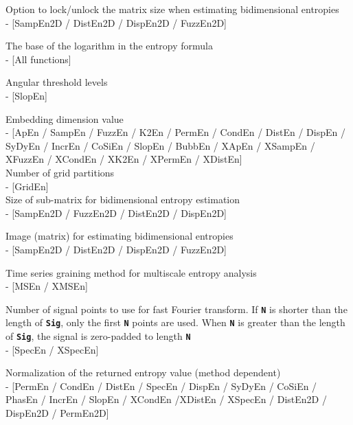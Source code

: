 \documentclass[12pt, a4paper, titlepage, openany]{book}
\begin{document}
\begin{description}[labelsep=1cm, labelwidth=2cm, nosep, style=multiline,leftmargin=3cm]
\item[\texttt{Lock}]		 Option to lock/unlock the matrix size when estimating bidimensional entropies \\ - [SampEn2D / DistEn2D / DispEn2D / FuzzEn2D]\\
\item[\texttt{Logx}]		 The base of the logarithm in the entropy formula  \\ - [All functions]\\
\item[\texttt{Lvls}]		 Angular threshold levels \\ - [SlopEn]\\
\item[\texttt{m}]		 Embedding dimension value \\ - [ApEn / SampEn / FuzzEn / K2En / PermEn / CondEn / DistEn / DispEn / SyDyEn / IncrEn / CoSiEn / SlopEn / BubbEn / XApEn / XSampEn / XFuzzEn / XCondEn / XK2En / XPermEn / XDistEn] \\
Number of grid partitions \\ - [GridEn]\\
Size of sub-matrix for bidimensional entropy estimation \\ - [SampEn2D / FuzzEn2D / DistEn2D / DispEn2D]\\
\item[\texttt{Mat}]		Image (matrix) for estimating bidimensional entropies \\ - [SampEn2D / DistEn2D / DispEn2D / FuzzEn2D]\\
\item[\texttt{Methodx}]		Time series graining method for multiscale entropy analysis \\ - [MSEn / XMSEn]\\
\item[\texttt{N}]		Number of signal points to use for fast Fourier transform. If \texttt{\textbf{N}} is shorter than the length of \texttt{\textbf{Sig}}, only the first \texttt{\textbf{N}} points are used. When \texttt{\textbf{N}} is greater than the length of \texttt{\textbf{Sig}}, the signal is zero-padded to length \texttt{\textbf{N}} \\ - [SpecEn / XSpecEn]\\
\item[\texttt{Norm}]		Normalization of the returned entropy value (method dependent) \\
 - [PermEn / CondEn / DistEn / SpecEn / DispEn / SyDyEn / CoSiEn / PhasEn / IncrEn / SlopEn / XCondEn /XDistEn / XSpecEn / DistEn2D / DispEn2D / PermEn2D]\\

\end{description}
\end{document}
